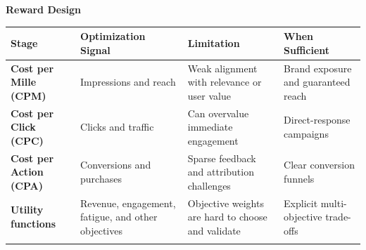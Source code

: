 \documentclass[manuscript,review,screen]{acmart}
\begin{document}
\begin{table}[ht]
\centering
\footnotesize
\renewcommand{\arraystretch}{1.25}
\setlength{\tabcolsep}{3pt}

\textbf{Reward Design}\\[0.3em]
\begin{tabularx}{\textwidth}{>{\raggedright\arraybackslash}p{} >{\raggedright\arraybackslash}p{} >{\raggedright\arraybackslash}p{} >{\raggedright\arraybackslash}p{}}
\toprule
\textbf{Stage} & \textbf{Optimization Signal} & \textbf{Limitation} & \textbf{When Sufficient} \\
\midrule
\textbf{Cost per Mille (CPM)} & Impressions and reach & Weak alignment with relevance or user value & Brand exposure and guaranteed reach \\
\textbf{Cost per Click (CPC)} & Clicks and traffic & Can overvalue immediate engagement & Direct-response campaigns \\
\textbf{Cost per Action (CPA)} & Conversions and purchases & Sparse feedback and attribution challenges & Clear conversion funnels \\
\textbf{Utility functions} & Revenue, engagement, fatigue, and other objectives & Objective weights are hard to choose and validate & Explicit multi-objective trade-offs \\
\midrule
\multicolumn{4}{>{\raggedright\arraybackslash}p{0.94\textwidth}}{\emph{Representative sources:} \cite{hu2004performance, fain2006sponsored, engel2008incorporating, yan2020ads}.} \\
\bottomrule
\end{tabularx}

\vspace{1em}


\end{table}
\end{document}
